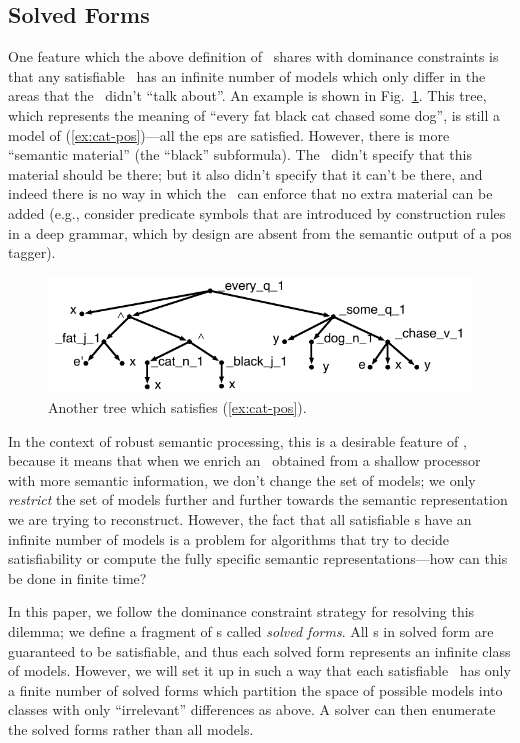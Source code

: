 \subsection{Solved Forms}

One feature which the above definition of \rmrs\ shares with dominance
constraints is that any satisfiable \rmrs\ has an infinite number of
models which only differ in the areas that the \rmrs\ didn't ``talk
about''.  An example is shown in Fig.~\ref{fig:fat-black-cat}.  This
tree, which represents the meaning of ``every fat black cat chased
some dog'', is still a model
of (\ref{ex:cat-pos})---all the {\sc ep}s are satisfied.  However, there is
more ``semantic material'' (the ``black'' subformula).  The \rmrs\
didn't specify that this material should be there; but it also didn't
specify that it can't be there, and indeed there is no way in which
the \rmrs\ can enforce that no extra material can be added (e.g.,
consider predicate symbols that are introduced by construction rules
in a deep grammar, which by design are absent from the semantic output
of a {\sc pos} tagger).


\begin{figure}
  \centering
  \includegraphics[width=\columnwidth]{pic-more-stuff}
  \caption{Another tree which satisfies (\ref{ex:cat-pos}).}
  \label{fig:fat-black-cat}
\end{figure}


In the context of robust semantic processing, this is a desirable
feature of \rmrs, because it means that when we enrich an \rmrs\
obtained from a shallow processor with more semantic information, we
don't change the set of models; we only \emph{restrict} the set of
models further and further towards the semantic representation we are
trying to reconstruct.  However, the fact that all satisfiable \rmrs s
have an infinite number of models is a problem for algorithms that try
to decide satisfiability or compute the fully specific semantic
representations---how can this be done in finite time?

In this paper, we follow the dominance constraint strategy for
resolving this dilemma; we
define a fragment of \rmrs s called \emph{solved forms}.  All \rmrs
s in solved form are guaranteed to be satisfiable, and thus each
solved form represents an infinite class of models.  However, we will
set it up in such a way that each satisfiable \rmrs\ has only a finite
number of solved forms which partition the space of possible models
into classes with only ``irrelevant'' differences as above.  A solver
can then enumerate the solved forms rather than all models.

